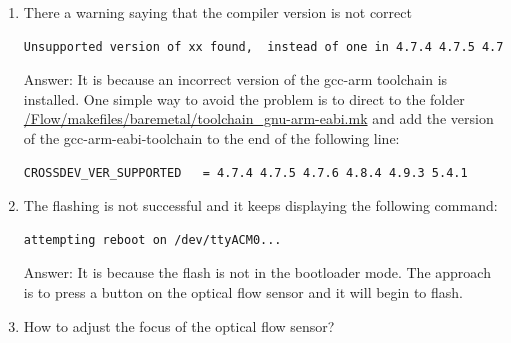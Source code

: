 \documentclass[idxtotoc,hyperref,openany]{labbook} %
\begin{document}
\begin{enumerate}
\item There a warning saying that the compiler version is not correct
\begin{lstlisting}[language=bash]
Unsupported version of xx found,  instead of one in 4.7.4 4.7.5 4.7.6 4.8.4 4.9.3 5.4.1
\end{lstlisting}

Answer: It is because an incorrect version of the gcc-arm toolchain is installed. One simple way to avoid the problem is to direct to the folder \url{/Flow/makefiles/baremetal/toolchain_gnu-arm-eabi.mk} and add the version of the gcc-arm-eabi-toolchain to the end of the following line:
\begin{lstlisting}[language=bash]
CROSSDEV_VER_SUPPORTED	 = 4.7.4 4.7.5 4.7.6 4.8.4 4.9.3 5.4.1
\end{lstlisting}

\item The flashing is not successful and it keeps displaying the following command:
\begin{lstlisting}[language=bash]
attempting reboot on /dev/ttyACM0...
\end{lstlisting}

Answer: It is because the flash is not in the bootloader mode. The approach is to press a button on the optical flow sensor and it will begin to flash.
\item How to adjust the focus of the optical flow sensor?


\end{enumerate}
\end{document}
